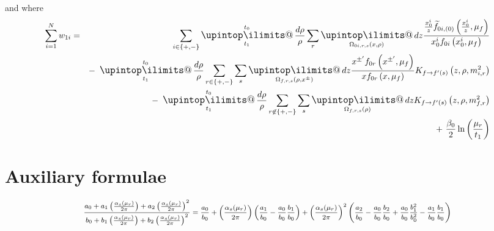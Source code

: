 \documentclass[a4paper,11pt]{article}
\makeatletter
\newcommand{\mksmall}[1]{\textnormal{\smaller$#1$}}
\newcommand{\xftilde}[3]{#2 \widetilde{f}_{#1}\left(#2, #3\right)}
\newcommand{\xf}[3]{#2 f_{#1}\left(#2, #3\right)}
\newcommand{\pskernel}[3]{K_{#1\rightarrow #2}\left(#3\right)}
\newcommand{\upint}{\DOTSI\upintop\ilimits@}
\renewcommand{\int}{\mathop{\mathlarger{\upint}}}
\makeatother
\begin{document}
and where
\begin{eqnarray*}
\sum_{i=1}^N w_{1i} &=& 
\sum_{i\in\{+,-\}}
\int\displaylimits_{t_1}^{t_0} \frac{d\rho}{\rho} \sum\limits_{r}\int\displaylimits_{\Omega_{0i,r,s}(x,\rho)} dz
\frac{\xftilde{0i,(0)}{\frac{x_0^i}{z}}{\mu_f}}{\xf{0i}{x_0^i}{\mu_f}} 
\\&&
-~
\int\displaylimits_{t_1}^{t_0} \frac{d\rho}{\rho} \sum\limits_{r\in \{+,-\}} \sum\limits_{s} \int\displaylimits_{\Omega_{f,r,s}(\rho,x^\pm)} dz 
\frac{\xf{0r}{x^{\pm'}}{\mu_f}}{\xf{0r}{x}{\mu_f}} 
\pskernel{f}{f'(s)}{z,\rho,m_{i,r}^2}
\\&&
-~
\int\displaylimits_{t_1}^{t_0} \frac{d\rho}{\rho} \sum\limits_{r\not\in \{+,-\}} \sum\limits_{s} \int\displaylimits_{\Omega_{f,r,s}(\rho)} dz \pskernel{f}{f'(s)}{z,\rho,m_{f,r}^2}
\\&&
+~
\frac{\beta_0}{2}\ln\left(\frac{\mu_r}{t_1}\right)
\end{eqnarray*}

\newpage

\section*{Auxiliary formulae}

\begin{eqnarray*}
\mksmall{\frac{a_0 + a_1 \left(\frac{\alpha_s(\mu_r)}{2\pi}\right) + a_2 \left(\frac{\alpha_s(\mu_r)}{2\pi}\right)^2 }{ b_0 + b_1 \left(\frac{\alpha_s(\mu_r)}{2\pi}\right)  + b_2 \left(\frac{\alpha_s(\mu_r)}{2\pi}\right)^2 }
=
\frac{a_0}{b_0}
+ \left(\frac{\alpha_s(\mu_r)}{2\pi}\right) \left( \frac{a_1}{b_0} - \frac{a_0}{b_0} \frac{b_1}{b_0}\right)
+ \left(\frac{\alpha_s(\mu_r)}{2\pi}\right)^2 \left(\frac{a_2}{b_0} - \frac{a_0}{b_0} \frac{b_2}{b_0} + \frac{a_0}{b_0} \frac{b_1^2}{b_0^2} - \frac{a_1}{b_0}\frac{b_1}{b_0}\right)}
\end{eqnarray*}
\end{document}
